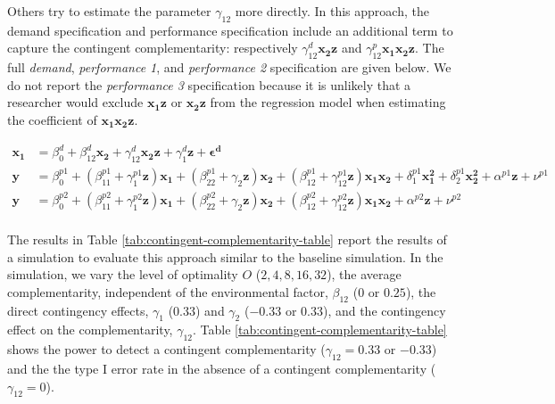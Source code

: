 \documentclass[12pt]{article}
\begin{document}


Others try to estimate the parameter $\gamma_{12}$ more directly. In this approach, the demand specification and performance specification include an additional term to capture the contingent complementarity: respectively $\gamma^d_{12} \mathbf{x_2 z}$ and $\gamma^p_{12} \mathbf{x_1 x_2 z}$. The full \emph{demand}, \emph{performance 1}, and \emph{performance 2} specification are given below. We do not report the \emph{performance 3} specification because it is unlikely that a researcher would exclude $\mathbf{x_1 z}$ or $\mathbf{x_2 z}$ from the regression model when estimating the coefficient of $\mathbf{x_1 x_2 z}$.


\begin{align*} 
\mathbf{x_1} &= \beta_0^d + \beta_{12}^d \mathbf{x_2} + \gamma_{12}^d \mathbf{x_2 z}
        + \gamma_{1}^d \mathbf{z}
        + \mathbf{\epsilon^d} \\
\mathbf{y} &=  \beta^{p1}_0 + (\beta^{p1}_{11} + \gamma_1^{p1} \mathbf{z} )\mathbf{x_1} 
						+ (\beta_{22}^{p1} + \gamma_2 \mathbf{z} ) \mathbf{x_2} 
                        + (\beta_{12}^{p1} + \gamma_{12}^{p1} \mathbf{z}) \mathbf{x_1} \mathbf{x_2} 
                        + \delta_1^{p1} \mathbf{x^2_1} + \delta_2^{p1} \mathbf{x^2_2} 
                        + \alpha^{p1} \mathbf{z}
                        + \nu^{p1} \\
 \mathbf{y} &=  \beta^{p2}_0 + (\beta^{p2}_{11} + \gamma_1^{p2} \mathbf{z} )\mathbf{x_1} 
						+ (\beta_{22}^{p2} + \gamma_2 \mathbf{z} ) \mathbf{x_2} 
                        + (\beta_{12}^{p2} + \gamma_{12}^{p2} \mathbf{z}) \mathbf{x_1} \mathbf{x_2} 
                        + \alpha^{p2} \mathbf{z}
                        + \nu^{p2} \\
\end{align*}

The results in Table \ref{tab:contingent-complementarity-table} report the results of a simulation to evaluate this approach similar to the baseline simulation. In the simulation, we vary the level of optimality $O$ ($2, 4, 8, 16, 32$), the average complementarity, independent of the environmental factor, $\beta_{12}$ ($0$ or $0.25$), the direct contingency effects, $\gamma_1$ ($0.33$) and $\gamma_2$ ($-0.33$ or $0.33$), and the contingency effect on the complementarity, $\gamma_{12}$. Table \ref{tab:contingent-complementarity-table} shows the power to detect a contingent complementarity ($\gamma_{12} = 0.33$ or $-0.33$) and the the type I error rate in the absence of a contingent complementarity ($\gamma_{12} = 0$). 
\end{document}
